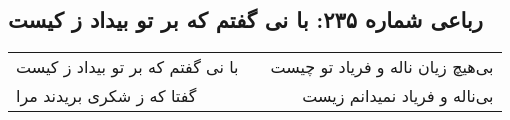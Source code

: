 \begin{center}
\section*{رباعی شماره ۲۳۵: با نی گفتم که بر تو بیداد ز کیست}
\label{sec:0235}
\begin{longtable}{l p{0.5cm} r}
با نی گفتم که بر تو بیداد ز کیست
&&
بی‌هیچ زیان ناله و فریاد تو چیست
\\
گفتا که ز شکری بریدند مرا
&&
بی‌ناله و فریاد نمیدانم زیست
\\
\end{longtable}
\end{center}

